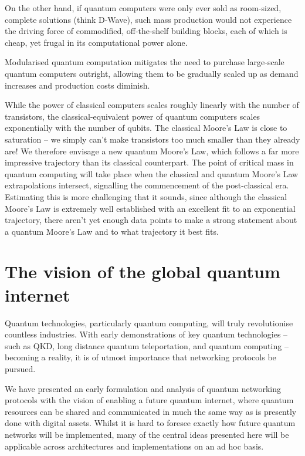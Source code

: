 \documentclass[aps,rmp,twocolumn,amsmath,amssymb,nofootinbib,superscriptaddress]{revtex4}
\begin{document}
On the other hand, if quantum computers were only ever sold as room-sized, complete solutions (think D-Wave), such mass production would not experience the driving force of commodified, off-the-shelf building blocks, each of which is cheap, yet frugal in its computational power alone.

Modularised quantum computation mitigates the need to purchase large-scale quantum computers outright, allowing them to be gradually scaled up as demand increases and production costs diminish.

While the power of classical computers scales roughly linearly with the number of transistors, the classical-equivalent power of quantum computers scales exponentially with the number of qubits. The classical Moore's Law is close to saturation -- we simply can't make transistors too much smaller than they already are! We therefore envisage a new quantum Moore's Law, which follows a far more impressive trajectory than its classical counterpart. The point of critical mass in quantum computing will take place when the classical and quantum Moore's Law extrapolations intersect, signalling the commencement of the post-classical era. Estimating this is more challenging that it sounds, since although the classical Moore's Law is extremely well established with an excellent fit to an exponential trajectory, there aren't yet enough data points to make a strong statement about a quantum Moore's Law and to what trajectory it best fits.

%
%

\section{The vision of the global quantum internet}

Quantum technologies, particularly quantum computing, will truly revolutionise countless industries. With early demonstrations of key quantum technologies -- such as QKD, long distance quantum teleportation, and quantum computing -- becoming a reality, it is of utmost importance that networking protocols be pursued.

We have presented an early formulation and analysis of quantum networking protocols with the vision of enabling a future quantum internet, where quantum resources can be shared and communicated in much the same way as is presently done with digital assets. Whilst it is hard to foresee exactly how future quantum networks will be implemented, many of the central ideas presented here will be applicable across architectures and implementations on an ad hoc basis.
\end{document}
